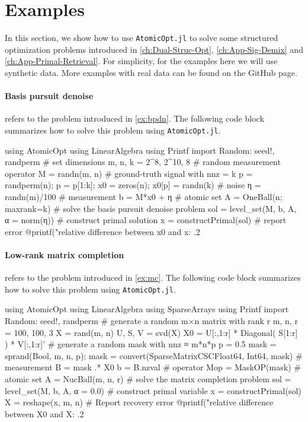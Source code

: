 \section{Examples} \label{sec:5-4}

In this section, we show how to use \texttt{AtomicOpt.jl} to solve some structured optimization problems introduced in \autoref{ch:Dual-Struc-Opt}, \autoref{ch:App-Sig-Demix} and \autoref{ch:App-Primal-Retrieval}. For simplicity, for the examples here we will use synthetic data. More examples with real data can be found on the GitHub page. 

\paragraph{Basis pursuit denoise} refers to the problem introduced in \autoref{ex:bpdn}. The following code block summarizes how to solve this problem using \texttt{AtomicOpt.jl}.
\begin{code}
  using AtomicOpt
  using LinearAlgebra
  using Printf
  import Random: seed!, randperm
  # set dimensions
  m, n, k = 2^8, 2^10, 8
  # random measurement operator
  M = randn(m, n) 
  # ground-truth signal with nnz = k
  p = randperm(n); p = p[1:k]; 
  x0 = zeros(n); x0[p] = randn(k)
  # noise
  η = randn(m)/100
  # measurement
  b = M*x0 + η
  # atomic set
  A = OneBall(n; maxrank=k)
  # solve the basis pursuit denoise problem
  sol = level_set(M, b, A, α = norm(η))
  # construct primal solution
  x = constructPrimal(sol)
  # report error
  @printf("relative difference between x0 and x: .2%
\end{code}

\paragraph{Low-rank matrix completion} refers to the problem introduced in \autoref{ex:mc}. The following code block summarizes how to solve this problem using \texttt{AtomicOpt.jl}.
\begin{code}
  using AtomicOpt
  using LinearAlgebra
  using SparseArrays
  using Printf
  import Random: seed!, randperm
  # generate a random m×n matrix with rank r
  m, n, r = 100, 100, 3 
  X = rand(m, n)
  U, S, V = svd(X)
  X0 = U[:,1:r] * Diagonal( S[1:r] ) * V[:,1:r]'
  # generate a random mask with nnz ≈ m*n*p
  p = 0.5
  mask = sprand(Bool, m, n, p); 
  mask = convert(SparseMatrixCSC{Float64, Int64}, mask)
  # measurement
  B =  mask .* X0
  b =  B.nzval
  # operator
  Mop = MaskOP(mask)
  # atomic set
  A = NucBall(m, n, r)
  # solve the matrix completion problem
  sol = level_set(M, b, A, α = 0.0)
  # construct primal variable
  x = constructPrimal(sol)
  X = reshape(x, m, n)
  # Report recovery error
  @printf("relative difference between X0 and X: .2%
\end{code}

